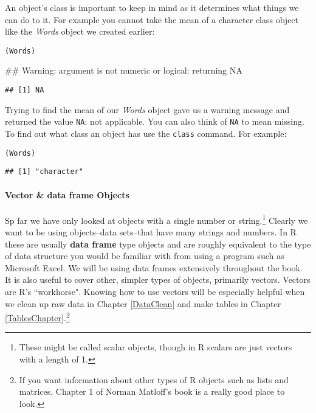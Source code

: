An object's class is important to keep in mind as it determines what things we can do to it. For example you cannot take the mean of a character class object like the {\emph{Words}} object we created earlier:

\begin{knitrout}
\color{fgcolor}\begin{kframe}
\begin{alltt}
(Words)
\end{alltt}


{\ttfamily\noindent\textcolor{warningcolor}{\#\# Warning: argument is not numeric or logical: returning NA}}\begin{verbatim}
## [1] NA
\end{verbatim}
\end{kframe}
\end{knitrout}


\noindent Trying to find the mean of our {\emph{Words}} object gave us a warning message and returned the value {\tt{NA}}: not applicable. You can also think of {\tt{NA}} to mean missing. To find out what class an object has use the {\tt{class}} command. For example:

\begin{knitrout}
\color{fgcolor}\begin{kframe}
\begin{alltt}
(Words)
\end{alltt}
\begin{verbatim}
## [1] "character"
\end{verbatim}
\end{kframe}
\end{knitrout}


\paragraph{Vector \& data frame Objects}

Sp far we have only looked at objects with a single number or string.\footnote{These might be called scalar objects, though in R scalars are just vectors with a length of 1.} Clearly we want to be using objects--data sets--that have many strings and numbers. In R these are usually {\bf{data frame}} type objects and are roughly equivalent to the type of data structure you would be familiar with from using a program such as Microsoft Excel. We will be using data frames extensively throughout the book. It is also useful to cover other, simpler types of objects, primarily vectors. Vectors are R's ``workhorse".\cite{Matloff2011} Knowing how to use vectors will be especially helpful when we clean up raw data in Chapter \ref{DataClean} and make tables in Chapter \ref{TablesChapter}.\footnote{If you want information about other types of R objects such as lists and matrices, Chapter 1 of Norman Matloff's book\cite{Matlof2011} is a really good place to look.} \\[0.25cm]

